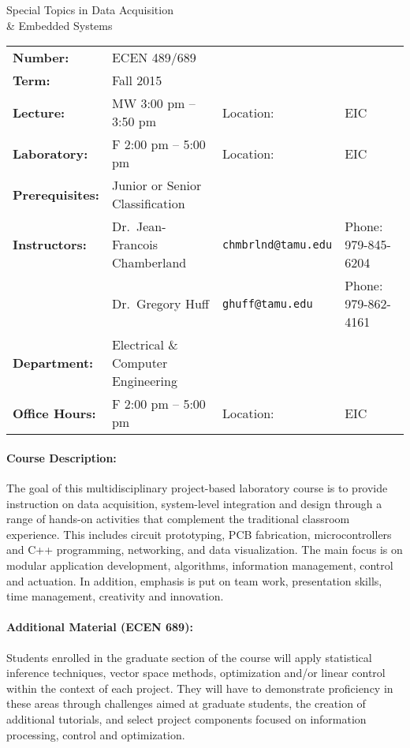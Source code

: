 \documentclass{article}
\begin{document}
\begin{center}
{\LARGE \sc Special Topics in Data Acquisition\\
\& Embedded Systems\\[5mm]}
\end{center}

\noindent
\begin{tabular}{llll}
\textbf{Number:} & ECEN 489/689 \tabularnewline[1mm]
\textbf{Term:} & Fall 2015 \tabularnewline[1mm]
\textbf{Lecture:} & MW 3:00 pm -- 3:50 pm & {Location:} & EIC \tabularnewline[1mm]
\textbf{Laboratory:} & F 2:00 pm -- 5:00 pm & {Location:} & EIC \tabularnewline[1mm]
\textbf{Prerequisites:} &  Junior or Senior Classification \tabularnewline[1mm]
\textbf{Instructors:} & Dr.~Jean-Francois Chamberland & \texttt{chmbrlnd@tamu.edu} & Phone: 979-845-6204 \tabularnewline[1mm]
& Dr.~Gregory Huff & \texttt{ghuff@tamu.edu} & Phone: 979-862-4161 \tabularnewline[1mm]
\textbf{Department:} & Electrical \& Computer Engineering \tabularnewline[1mm]
\textbf{Office Hours:} & F 2:00 pm -- 5:00 pm & {Location:} & EIC \tabularnewline[1mm]
\end{tabular}


\paragraph{Course Description:}
The goal of this multidisciplinary project-based laboratory course is to provide instruction on data acquisition, system-level integration and design through a range of hands-on activities that complement the traditional classroom experience.
This includes circuit prototyping, PCB fabrication, microcontrollers and C++ programming, networking, and data visualization.
The main focus is on modular application development, algorithms, information management, control and actuation.
In addition, emphasis is put on team work, presentation skills, time management, creativity and innovation.


\paragraph{Additional Material (ECEN 689):}
Students enrolled in the graduate section of the course will apply statistical inference techniques, vector space methods, optimization and/or linear control within the context of each project.
They will have to demonstrate proficiency in these areas through challenges aimed at graduate students, the creation of additional tutorials, and select project components focused on information processing, control and optimization.
\end{document}
